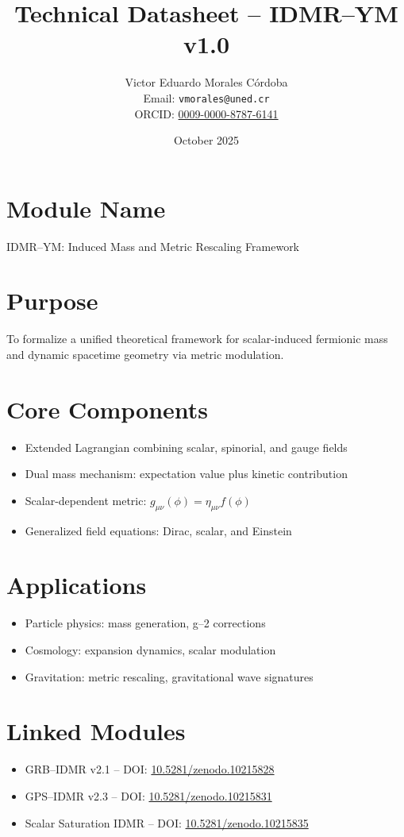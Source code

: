 \documentclass[12pt]{article}
\title{Technical Datasheet – IDMR–YM v1.0}
\author{
Victor Eduardo Morales Córdoba \\
Email: \texttt{vmorales@uned.cr} \\
ORCID: \href{https://orcid.org/0009-0000-8787-6141}{0009-0000-8787-6141}
}
\date{October 2025}
\begin{document}
\maketitle

\section*{Module Name}
IDMR–YM: Induced Mass and Metric Rescaling Framework

\section*{Purpose}
To formalize a unified theoretical framework for scalar-induced fermionic mass and dynamic spacetime geometry via metric modulation.

\section*{Core Components}
\begin{itemize}
  \item Extended Lagrangian combining scalar, spinorial, and gauge fields
  \item Dual mass mechanism: expectation value plus kinetic contribution
  \item Scalar-dependent metric: \( g_{\mu\nu}(\phi) = \eta_{\mu\nu} f(\phi) \)
  \item Generalized field equations: Dirac, scalar, and Einstein
\end{itemize}

\section*{Applications}
\begin{itemize}
  \item Particle physics: mass generation, g–2 corrections
  \item Cosmology: expansion dynamics, scalar modulation
  \item Gravitation: metric rescaling, gravitational wave signatures
\end{itemize}

\section*{Linked Modules}
\begin{itemize}
  \item GRB–IDMR v2.1 – DOI: \href{https://doi.org/10.5281/zenodo.10215828}{10.5281/zenodo.10215828}
  \item GPS–IDMR v2.3 – DOI: \href{https://doi.org/10.5281/zenodo.10215831}{10.5281/zenodo.10215831}
  \item Scalar Saturation IDMR – DOI: \href{https://doi.org/10.5281/zenodo.10215835}{10.5281/zenodo.10215835}
\end{itemize}
\end{document}
